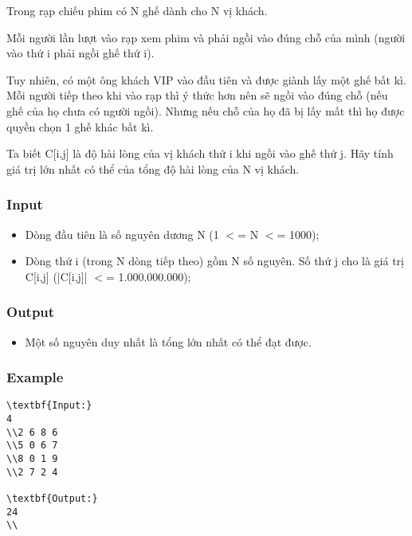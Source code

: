 



   Trong rạp chiếu phim có N ghế dành cho N vị khách.  

   Mỗi người lần lượt vào rạp xem phim và phải ngồi vào đúng chỗ của mình (người vào thứ i phải ngồi ghế thứ i).  

   Tuy nhiên, có một ông khách VIP vào đầu tiên và được giành lấy một ghế bất kì. Mỗi người tiếp theo khi vào rạp thì ý thức hơn nên sẽ ngồi vào đúng chỗ (nếu ghế của họ chưa có người ngồi). Nhưng nếu chỗ của họ đã bị lấy mất thì họ được quyền chọn 1 ghế khác bất kì.  

   Ta biết C[i,j] là độ hài lòng của vị khách thứ i khi ngồi vào ghế thứ j. Hãy tính giá trị lớn nhất có thể của tổng độ hài lòng của N vị khách.  

\subsubsection{   Input  }
\begin{itemize}
	\item     Dòng đầu tiên là số nguyên dương N (1 $<$= N $<$= 1000);   
	\item     Dòng thứ i (trong N dòng tiếp theo) gồm N số nguyên. Số thứ j cho là giá trị C[i,j] (|C[i,j]| $<$= 1.000.000.000);   
\end{itemize}

\subsubsection{   Output  }
\begin{itemize}
	\item     Một số nguyên duy nhất là tổng lớn nhất có thể đạt được.   
\end{itemize}

\subsubsection{   Example  }
\begin{verbatim}
\textbf{Input:}
4
\\2 6 8 6 
\\5 0 6 7 
\\8 0 1 9 
\\2 7 2 4

\textbf{Output:}
24
\\\end{verbatim}